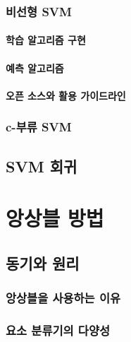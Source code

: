 \documentclass [12pt] {oblivoir}
\let\oldsubsubsection=\subsubsection
\renewcommand{\subsubsection}
{
  \filbreak
  \oldsubsubsection
}
\begin{document}
\subsubsection{비선형 SVM}

\paragraph*{학습 알고리즘 구현}\mbox{}

\vspace{3mm}

\paragraph*{예측 알고리즘}\mbox{}

\vspace{3mm}

\paragraph*{오픈 소스와 활용 가이드라인}\mbox{}

\vspace{3mm}

\subsubsection{c-부류 SVM}

\subsection{SVM 회귀}

\newpage
\section{앙상블 방법}

\subsection{동기와 원리}

\subsubsection{앙상블을 사용하는 이유}

\subsubsection{요소 분류기의 다양성}
\end{document}
